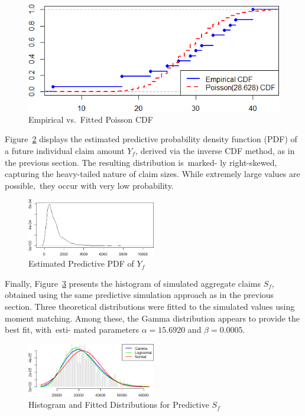 \documentclass{Class/julia}
\begin{document}
\begin{figure}[!ht]
    \centering
    \caption{Empirical vs.\ Fitted Poisson CDF}
    \label{fig:17}
    \includegraphics[width=.5\textwidth]{itamtplcost/empirical_vs_poisson.png}
\end{figure}

Figure~\ref{fig:18} displays the estimated predictive probability density function (PDF) of a future individual claim amount \( Y_f \), derived via the inverse CDF method, as in the previous section. The resulting distribution is~marked- ly right-skewed, capturing the heavy-tailed nature of claim sizes. While extremely large values are possible,~they occur with very low probability.

\begin{figure}[!ht]
\centering
\caption{Estimated Predictive PDF of \( Y_f \) }
\label{fig:18}
\includegraphics[width=0.5\textwidth]{itamtplcost/predictive_Y_f.png}
\end{figure}

Finally, Figure~\ref{fig:19} presents the histogram of simulated aggregate claims \( S_f \), obtained using the same predictive simulation approach as in the previous section. Three theoretical distributions were fitted to the simulated values using moment matching. Among these, the Gamma distribution appears to provide the best fit, with~esti- mated parameters \( \alpha = 15.6920 \) and \( \beta = 0.0005 \).

\begin{figure}[!ht]
\centering
\caption{Histogram and Fitted Distributions for Predictive \( S_f \)}
\label{fig:19}
\includegraphics[width=0.5\textwidth]{itamtplcost/predictive_S_f.png}
\end{figure}
\end{document}
